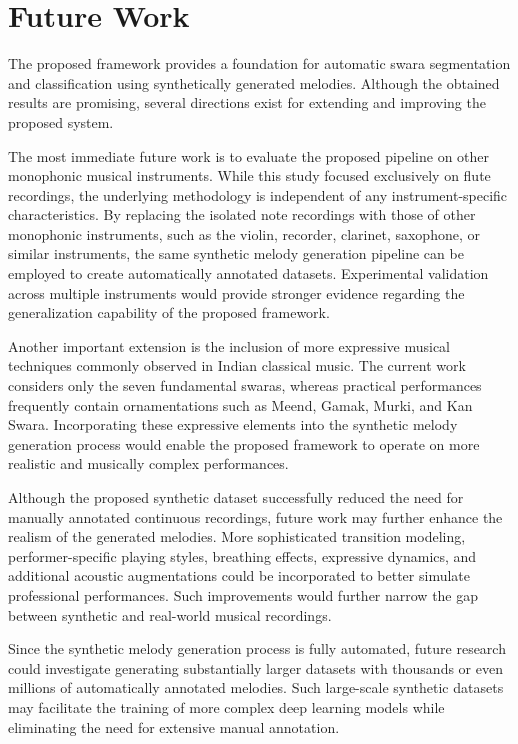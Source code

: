 \chapter{Future Work}
\label{ch:future-work}

The proposed framework provides a foundation for automatic swara segmentation and classification using synthetically generated melodies. Although the obtained results are promising, several directions exist for extending and improving the proposed system.

The most immediate future work is to evaluate the proposed pipeline on other monophonic musical instruments. While this study focused exclusively on flute recordings, the underlying methodology is independent of any instrument-specific characteristics. By replacing the isolated note recordings with those of other monophonic instruments, such as the violin, recorder, clarinet, saxophone, or similar instruments, the same synthetic melody generation pipeline can be employed to create automatically annotated datasets. Experimental validation across multiple instruments would provide stronger evidence regarding the generalization capability of the proposed framework.

Another important extension is the inclusion of more expressive musical techniques commonly observed in Indian classical music. The current work considers only the seven fundamental swaras, whereas practical performances frequently contain ornamentations such as Meend, Gamak, Murki, and Kan Swara. Incorporating these expressive elements into the synthetic melody generation process would enable the proposed framework to operate on more realistic and musically complex performances.

Although the proposed synthetic dataset successfully reduced the need for manually annotated continuous recordings, future work may further enhance the realism of the generated melodies. More sophisticated transition modeling, performer-specific playing styles, breathing effects, expressive dynamics, and additional acoustic augmentations could be incorporated to better simulate professional performances. Such improvements would further narrow the gap between synthetic and real-world musical recordings.

Since the synthetic melody generation process is fully automated, future research could investigate generating substantially larger datasets with thousands or even millions of automatically annotated melodies. Such large-scale synthetic datasets may facilitate the training of more complex deep learning models while eliminating the need for extensive manual annotation.

